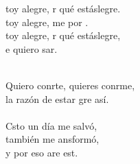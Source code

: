 \begin{cancion}%
	\begin{chorus}%
	toy alegre, r qué estáslegre.\\
	toy alegre, me por . \\
	toy alegre, r qué estáslegre,\\
	e quiero sar.\\
	\end{chorus}%
	\jump\\
	Quiero conrte, quieres conrme,\\
	la razón de estar gre así.\\
	\jump\\
	Csto un día me salvó,\\
	también me ansformó,\\
	y por eso are est.\\
\end{cancion}%
